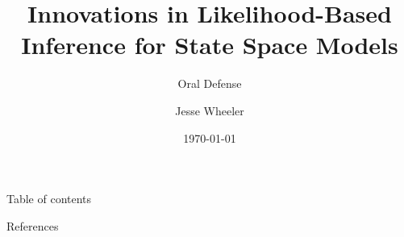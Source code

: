 \documentclass[aspectratio=169, 10pt]{beamer}\usepackage[]{graphicx}\usepackage[]{xcolor}
\title[]{Innovations in Likelihood-Based Inference for State Space Models}
\subtitle{Oral Defense}
\date[]{\today}
\author[Wheeler]{Jesse Wheeler}
\institute{Department of Statistics, University of Michigan}
\newcommand{\themename}{\textbf{\textsc{Gotham}}}
\begin{document}
\maketitle

	\begin{frame}[toc]{Table of contents}%
		\tableofcontents%
	\end{frame}

	
% 











% 


% 
% 
% 
% 



  \begin{frame}[allowframebreaks]{References}
    
    
  \end{frame}
\end{document}
